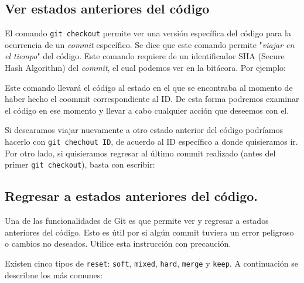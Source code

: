 \subsection{Ver estados anteriores del
código}\label{ver-estados-anteriores-del-cuxf3digo}

El comando \texttt{git\ checkout} permite ver una versión específica del
código para la ocurrencia de un \emph{commit} específico. Se dice que
este comando permite "\emph{viajar en el tiempo}" del código. Este
comando requiere de un identificador SHA (Secure Hash Algorithm) del
\emph{commit}, el cual podemos ver en la bitácora. Por ejemplo:

\begin{Shaded}
\begin{Highlighting}[]
    \ExtensionTok{$}\NormalTok{ git checkout [}\OperatorTok{\textless{}}\OperatorTok{\textgreater{}}\NormalTok{]}
\end{Highlighting}
\end{Shaded}

Este comando llevará el código al estado en el que se encontraba al
momento de haber hecho el coommit correspondiente al ID. De esta forma
podremos examinar el código en ese momento y llevar a cabo cualquier
acción que deseemos con el.

Si desearamos viajar nuevamente a otro estado anterior del código
podríamos hacerlo con \texttt{git\ chechout\ ID}, de acuerdo al ID
específico a donde quisieramos ir. Por otro lado, si quisieramos
regresar al último commit realizado (antes del primer
\texttt{git\ checkout}), basta con escribir:

\begin{Shaded}
\begin{Highlighting}[]
    \ExtensionTok{$}
\end{Highlighting}
\end{Shaded}

\subsection{Regresar a estados anteriores del
código.}\label{regresar-a-estados-anteriores-del-cuxf3digo.}

Una de las funcionalidades de Git es que permite ver y regresar a
estados anteriores del código. Esto es útil por si algún commit tuviera
un error peligroso o cambios no deseados. Utilice esta instrucción con
precaución.

Existen cinco tipos de \texttt{reset}: \texttt{soft}, \texttt{mixed},
\texttt{hard}, \texttt{merge} y \texttt{keep}. A continuación se
describne los más comunes:

